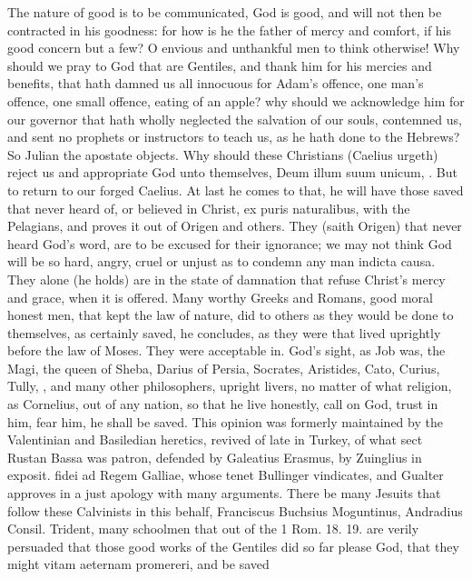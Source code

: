 {The nature of good is to be communicated, God is good, and will not
then be contracted in his goodness: for how is he the father of mercy
and comfort, if his good concern but a few? O envious and unthankful
men to think otherwise! Why should we pray to God that are
Gentiles, and thank him for his mercies and benefits, that hath damned
us all innocuous for Adam's offence, one man's offence, one small
offence, eating of an apple? why should we acknowledge him for our
governor that hath wholly neglected the salvation of our souls,
contemned us, and sent no prophets or instructors to teach us, as he
hath done to the Hebrews? So Julian the apostate objects. Why should
these Christians (Caelius urgeth) reject us and appropriate God unto
themselves, Deum illum suum unicum, \etc{}. But to return to our forged
Caelius. At last he comes to that, he will have those saved that never
heard of, or believed in Christ, ex puris naturalibus, with the
Pelagians, and proves it out of Origen and others. They (saith
Origen) that never heard God's word, are to be excused for their
ignorance; we may not think God will be so hard, angry, cruel or unjust
as to condemn any man indicta causa. They alone (he holds) are in the
state of damnation that refuse Christ's mercy and grace, when it is
offered. Many worthy Greeks and Romans, good moral honest men, that
kept the law of nature, did to others as they would be done to
themselves, as certainly saved, he concludes, as they were that lived
uprightly before the law of Moses. They were acceptable in. God's
sight, as Job was, the Magi, the queen of Sheba, Darius of Persia,
Socrates, Aristides, Cato, Curius, Tully, \Seneca, and many other
philosophers, upright livers, no matter of what religion, as Cornelius,
out of any nation, so that he live honestly, call on God, trust in him,
fear him, he shall be saved. This opinion was formerly maintained by
the Valentinian and Basiledian heretics, revived of late in
Turkey, of what sect Rustan Bassa was patron, defended by
Galeatius Erasmus, by Zuinglius in exposit. fidei ad Regem
Galliae, whose tenet Bullinger vindicates, and Gualter approves in a
just apology with many arguments. There be many Jesuits that follow
these Calvinists in this behalf, Franciscus Buchsius Moguntinus,
Andradius Consil. Trident, many schoolmen that out of the 1 Rom.  18.
19. are verily persuaded that those good works of the Gentiles did so
far please God, that they might vitam aeternam promereri, and be saved
}
